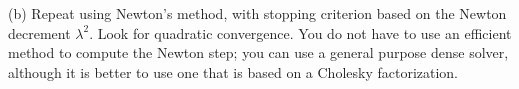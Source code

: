 \documentclass[11pt]{article}
\begin{document}
(b) Repeat using Newton's method, with stopping criterion based on the Newton decrement $\lambda^2$. Look for quadratic convergence. You do not have to use an efficient method to compute the Newton step; you can use a general purpose dense solver, although it is better to use one that is based on a Cholesky factorization.
\end{document}
